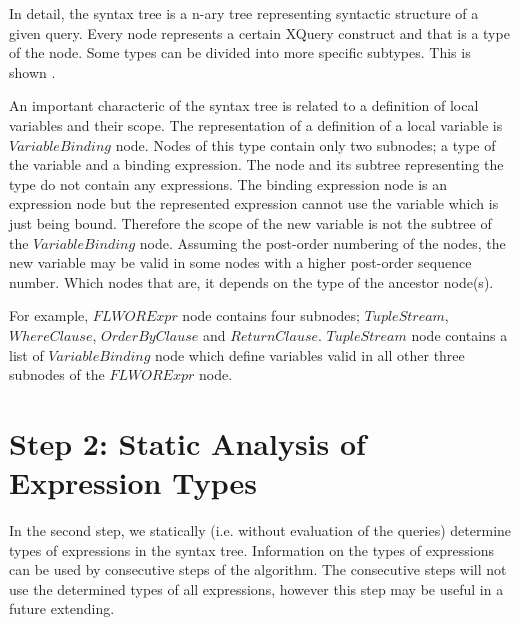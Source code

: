 
In detail, the syntax tree is a n-ary tree representing syntactic structure of a given query. Every node represents a certain XQuery construct and that is a type of the node. Some types can be divided into more specific subtypes. This is shown .


An important characteric of the syntax tree is related to a definition of local variables and their scope. The representation of a definition of a local variable is $VariableBinding$ node. Nodes of this type contain only two subnodes; a type of the variable and a binding expression. The node and its subtree representing the type do not contain any expressions. The binding expression node is an expression node but the represented expression cannot use the variable which is just being bound. Therefore the scope of the new variable is not the subtree of the $VariableBinding$ node. Assuming  the post-order numbering of the nodes, the new variable may be valid in some nodes with a higher post-order sequence number. Which  nodes that are, it depends on the type of the ancestor node(s).

For example, $FLWORExpr$ node contains four subnodes; $TupleStream$, $WhereClause$, $OrderByClause$ and $ReturnClause$. $TupleStream$ node contains a list of $VariableBinding$ node which define variables valid in all other three subnodes of the $FLWORExpr$ node.


\section{Step 2: Static Analysis of Expression Types}
In the second step, we statically (i.e. without evaluation of the queries) determine types of expressions in the syntax tree. Information on the types of expressions can be used by consecutive steps of the algorithm. The consecutive steps will not use the determined types of all expressions, however this step may be useful in a future extending.



